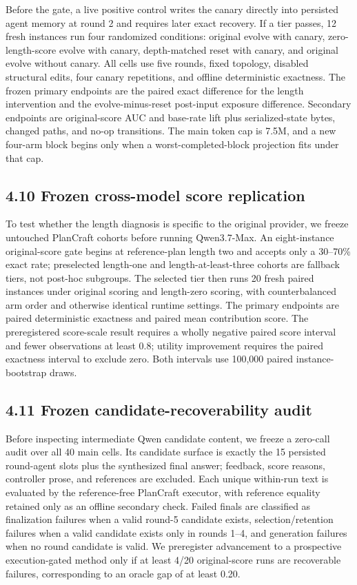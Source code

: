 \documentclass{article}
\begin{document}
Before the gate, a live positive control writes the canary directly into persisted agent memory at round 2 and requires later exact recovery. If a tier passes, 12 fresh instances run four randomized conditions: original evolve with canary, zero-length-score evolve with canary, depth-matched reset with canary, and original evolve without canary. All cells use five rounds, fixed topology, disabled structural edits, four canary repetitions, and offline deterministic exactness. The frozen primary endpoints are the paired exact difference for the length intervention and the evolve-minus-reset post-input exposure difference. Secondary endpoints are original-score AUC and base-rate lift plus serialized-state bytes, changed paths, and no-op transitions. The main token cap is 7.5M, and a new four-arm block begins only when a worst-completed-block projection fits under that cap.

\subsection{4.10 Frozen cross-model score replication}

To test whether the length diagnosis is specific to the original provider, we freeze untouched PlanCraft cohorts before running Qwen3.7-Max. An eight-instance original-score gate begins at reference-plan length two and accepts only a 30--70\% exact rate; preselected length-one and length-at-least-three cohorts are fallback tiers, not post-hoc subgroups. The selected tier then runs 20 fresh paired instances under original scoring and length-zero scoring, with counterbalanced arm order and otherwise identical runtime settings. The primary endpoints are paired deterministic exactness and paired mean contribution score. The preregistered score-scale result requires a wholly negative paired score interval and fewer observations at least 0.8; utility improvement requires the paired exactness interval to exclude zero. Both intervals use 100,000 paired instance-bootstrap draws.

\subsection{4.11 Frozen candidate-recoverability audit}

Before inspecting intermediate Qwen candidate content, we freeze a zero-call audit over all 40 main cells. Its candidate surface is exactly the 15 persisted round-agent \texttt{} slots plus the synthesized final answer; feedback, score reasons, controller prose, and references are excluded. Each unique within-run text is evaluated by the reference-free PlanCraft executor, with reference equality retained only as an offline secondary check. Failed finals are classified as finalization failures when a valid round-5 candidate exists, selection/retention failures when a valid candidate exists only in rounds 1--4, and generation failures when no round candidate is valid. We preregister advancement to a prospective execution-gated method only if at least 4/20 original-score runs are recoverable failures, corresponding to an oracle gap of at least 0.20.
\end{document}
